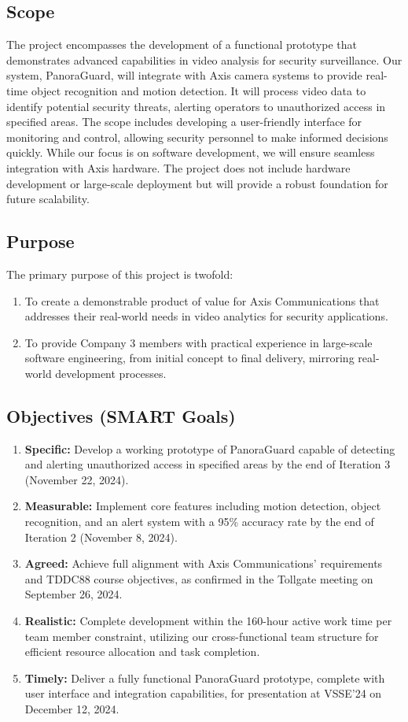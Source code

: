 \subsection{Scope}
The project encompasses the development of a functional prototype that demonstrates advanced capabilities in video analysis for security surveillance. Our system, PanoraGuard, will integrate with Axis camera systems to provide real-time object recognition and motion detection. It will process video data to identify potential security threats, alerting operators to unauthorized access in specified areas. The scope includes developing a user-friendly interface for monitoring and control, allowing security personnel to make informed decisions quickly. While our focus is on software development, we will ensure seamless integration with Axis hardware. The project does not include hardware development or large-scale deployment but will provide a robust foundation for future scalability.
    
\subsection{Purpose}
The primary purpose of this project is twofold:
\begin{enumerate}
    \item To create a demonstrable product of value for Axis Communications that addresses their real-world needs in video analytics for security applications.
    \item To provide Company 3 members with practical experience in large-scale software engineering, from initial concept to final delivery, mirroring real-world development processes.
\end{enumerate}
    
\subsection{Objectives (SMART Goals)}
\begin{enumerate}
    \item \textbf{Specific:} Develop a working prototype of PanoraGuard capable of detecting and alerting unauthorized access in specified areas by the end of Iteration 3 (November 22, 2024).
    \item \textbf{Measurable:} Implement core features including motion detection, object recognition, and an alert system with a 95\% accuracy rate by the end of Iteration 2 (November 8, 2024).
    \item \textbf{Agreed:} Achieve full alignment with Axis Communications' requirements and TDDC88 course objectives, as confirmed in the Tollgate meeting on September 26, 2024.
    \item \textbf{Realistic:} Complete development within the 160-hour active work time per team member constraint, utilizing our cross-functional team structure for efficient resource allocation and task completion.
    \item \textbf{Timely:} Deliver a fully functional PanoraGuard prototype, complete with user interface and integration capabilities, for presentation at VSSE'24 on December 12, 2024.
\end{enumerate}
    
